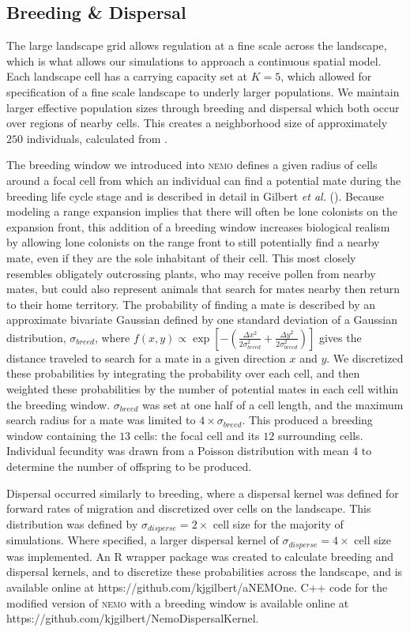 \subsection{Breeding \& Dispersal}
The large landscape grid allows regulation at a fine scale across the landscape, which is what allows our simulations to approach a continuous spatial model. Each landscape cell has a carrying capacity set at $K = 5$, which allowed for specification of a fine scale landscape to underly larger populations. We maintain larger effective population sizes through breeding and dispersal which both occur over regions of nearby cells. This creates a neighborhood size of approximately $250$ individuals, calculated from \citet{Wright:1946}. 

The breeding window we introduced into \textsc{nemo} defines a given radius of cells around a focal cell from which an individual can find a potential mate during the breeding life cycle stage and is described in detail in Gilbert \emph{et al.} (). Because modeling a range expansion implies that there will often be lone colonists on the expansion front, this addition of a breeding window increases biological realism by allowing lone colonists on the range front to still potentially find a nearby mate, even if they are the sole inhabitant of their cell. This most closely resembles obligately outcrossing plants, who may receive pollen from nearby mates, but could also represent animals that search for mates nearby then return to their home territory. The probability of finding a mate is described by an approximate bivariate Gaussian defined by one standard deviation of a Gaussian distribution, $\sigma_{breed}$, where $f(x,y) \propto \exp{[-(\frac{\Delta x^2}{2\sigma_{breed}^2}+\frac{\Delta y^2}{2\sigma_{breed}^2})]}$ gives the distance traveled to search for a mate in a given direction $x$ and $y$. We discretized these probabilities by integrating the probability over each cell, and then weighted these probabilities by the number of potential mates in each cell within the breeding window. $\sigma_{breed}$ was set at one half of a cell length, and the maximum search radius for a mate was limited to $4\times\sigma_{breed}$. This produced a breeding window containing the $13$ cells: the focal cell and its $12$ surrounding cells. Individual fecundity was drawn from a Poisson distribution with mean $4$ to determine the number of offspring to be produced.

Dispersal occurred similarly to breeding, where a dispersal kernel was defined for forward rates of migration and discretized over cells on the landscape. This distribution was defined by $\sigma_{disperse} = 2\times$ cell size for the majority of simulations. Where specified, a larger dispersal kernel of $\sigma_{disperse} = 4\times$ cell size was implemented. An R wrapper package was created to calculate breeding and dispersal kernels, and to discretize these probabilities across the landscape, and is available online at https://github.com/kjgilbert/aNEMOne. C++ code for the modified version of \textsc{nemo} with a breeding window is available online at https://github.com/kjgilbert/NemoDispersalKernel.

